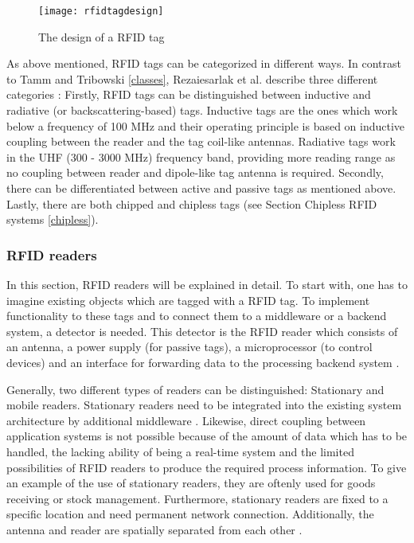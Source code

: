 \begin{figure}
\centering
\texttt{[image: rfidtagdesign]} 
\caption{\label{fig:tagdesign}The design of a RFID tag \cite[p.13]{chipless}} 
\end{figure}

As above mentioned, RFID tags can be categorized in different ways. In contrast to Tamm and Tribowski \ref{classes}, Rezaiesarlak et al. \cite{chipless} describe three different categories \cite[p.9 ff.]{chipless}: Firstly, RFID tags can be distinguished between inductive and radiative (or backscattering-based) tags. Inductive tags are the ones which work below a frequency of 100 MHz and their operating principle is based on inductive coupling between the reader and the tag coil-like antennas. Radiative tags work in the UHF (300 - 3000 MHz) frequency band, providing more reading range as no coupling between reader and dipole-like tag antenna is required. Secondly, there can be differentiated between active and passive tags as mentioned above. Lastly, there are both chipped and chipless tags (see Section Chipless RFID systems \ref{chipless}). 

\subsubsection{RFID readers} \label{reader}

In this section, RFID readers will be explained in detail. 
To start with, one has to imagine existing objects which are tagged with a RFID tag. To implement functionality to these tags and to connect them to a middleware or a backend system, a detector is needed. This detector is the RFID reader which consists of an antenna, a power supply (for passive tags), a microprocessor (to control devices) and an interface for forwarding data to the processing backend system \cite{henrici}. 

Generally, two different types of readers can be distinguished: Stationary and mobile readers. Stationary readers need to be integrated into the existing system architecture by additional middleware \cite[p.133 ff.]{mobile}. Likewise, direct coupling between application systems is not possible because of the amount of data which has to be handled, the lacking ability of being a real-time system and the limited possibilities of RFID readers to produce the required process information. To give an example of the use of stationary readers, they are oftenly used for goods receiving or stock management. Furthermore, stationary readers are fixed to a specific location and need permanent network connection. Additionally, the antenna and reader are spatially separated from each other \cite[p.17 ff.]{fokus}.

